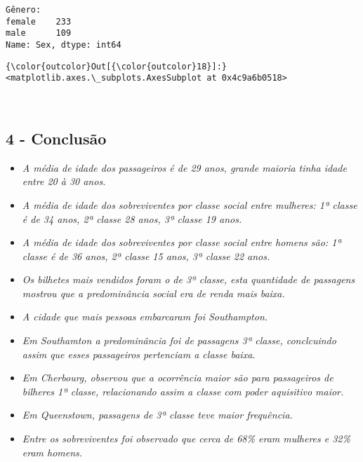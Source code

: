 \documentclass[11pt]{article}
\providecommand{\tightlist}{%
      \setlength{\itemsep}{0pt}\setlength{\parskip}{0pt}}
\begin{document}
    \begin{Verbatim}[commandchars=\\\{\}]
Gênero:
female    233
male      109
Name: Sex, dtype: int64

    \end{Verbatim}

\begin{Verbatim}[commandchars=\\\{\}]
{\color{outcolor}Out[{\color{outcolor}18}]:} <matplotlib.axes.\_subplots.AxesSubplot at 0x4c9a6b0518>
\end{Verbatim}
            
    \begin{center}
    \end{center}
    { \hspace*{\fill} \\}
    
    \hypertarget{conclusuxe3o}{%
\subsection{4 - Conclusão}\label{conclusuxe3o}}

\begin{itemize}
\tightlist
\item
  \emph{A média de idade dos passageiros é de 29 anos, grande maioria
  tinha idade entre 20 à 30 anos.}
\item
  \emph{A média de idade dos sobreviventes por classe social entre
  mulheres: 1ª classe é de 34 anos, 2ª classe 28 anos, 3ª classe 19
  anos.}
\item
  \emph{A média de idade dos sobreviventes por classe social entre
  homens são: 1ª classe é de 36 anos, 2ª classe 15 anos, 3ª classe 22
  anos.}
\item
  \emph{Os bilhetes mais vendidos foram o de 3ª classe, esta quantidade
  de passagens mostrou que a predominância social era de renda mais
  baixa.}
\item
  \emph{A cidade que mais pessoas embarcaram foi Southampton.}
\item
  \emph{Em Southamton a predominância foi de passagens 3ª classe,
  conclcuindo assim que esses passageiros pertenciam a classe baixa.}
\item
  \emph{Em Cherbourg, observou que a ocorrência maior são para
  passageiros de bilheres 1ª classe, relacionando assim a classe com
  poder aquisitivo maior.}
\item
  \emph{Em Queenstown, passagens de 3ª classe teve maior frequência.}
\item
  \emph{Entre os sobreviventes foi observado que cerca de 68\% eram
  mulheres e 32\% eram homens.}
\end{itemize}
\end{document}
